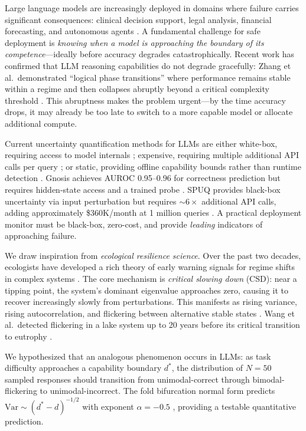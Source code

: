 \documentclass[11pt,letterpaper]{article}
\begin{document}
Large language models are increasingly deployed in domains where failure carries significant consequences: clinical decision support, legal analysis, financial forecasting, and autonomous agents \cite{huang2025survey}. A fundamental challenge for safe deployment is \emph{knowing when a model is approaching the boundary of its competence}---ideally before accuracy degrades catastrophically. Recent work has confirmed that LLM reasoning capabilities do not degrade gracefully: Zhang et al.\ demonstrated ``logical phase transitions'' where performance remains stable within a regime and then collapses abruptly beyond a critical complexity threshold \cite{zhang2026logical}. This abruptness makes the problem urgent---by the time accuracy drops, it may already be too late to switch to a more capable model or allocate additional compute.

Current uncertainty quantification methods for LLMs are either white-box, requiring access to model internals \cite{ghasemabadi2025gnosis}; expensive, requiring multiple additional API calls per query \cite{gao2024spuq}; or static, providing offline capability bounds rather than runtime detection \cite{chen2024reasoning}. Gnosis achieves AUROC 0.95--0.96 for correctness prediction but requires hidden-state access and a trained probe \cite{ghasemabadi2025gnosis}. SPUQ provides black-box uncertainty via input perturbation but requires ${\sim}6{\times}$ additional API calls, adding approximately \$360K/month at 1 million queries \cite{gao2024spuq}. A practical deployment monitor must be black-box, zero-cost, and provide \emph{leading} indicators of approaching failure.

We draw inspiration from \emph{ecological resilience science}. Over the past two decades, ecologists have developed a rich theory of early warning signals for regime shifts in complex systems \cite{scheffer2009, carpenter2006}. The core mechanism is \emph{critical slowing down} (CSD): near a tipping point, the system's dominant eigenvalue approaches zero, causing it to recover increasingly slowly from perturbations. This manifests as rising variance, rising autocorrelation, and flickering between alternative stable states \cite{scheffer2012, dakos2013}. Wang et al.\ detected flickering in a lake system up to 20 years before its critical transition to eutrophy \cite{wang2012flickering}.

We hypothesized that an analogous phenomenon occurs in LLMs: as task difficulty approaches a capability boundary $d^*$, the distribution of $N{=}50$ sampled responses should transition from unimodal-correct through bimodal-flickering to unimodal-incorrect. The fold bifurcation normal form predicts $\text{Var} \sim (d^* - d)^{-1/2}$ with exponent $\alpha = -0.5$ \cite{kuehn2011}, providing a testable quantitative prediction.
\end{document}
